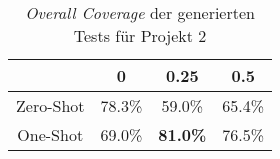 \bgroup
\def\arraystretch{2}
\begin{table}[H]
	\vspace{.5cm}
	\centering		
	\begin{center}
		\begin{tabular}{|c||c|c|c|}
			\hline 
			& 0 & 0.25 & 0.5 \\
			\hline 
			\hline
			Zero-Shot & 78.3\% & 59.0\% & 65.4\% \\
			\hline
			One-Shot & 69.0\% & \textbf{81.0\%} & 76.5\% \\
			\hline
		\end{tabular} 
	\end{center}
	\caption{\textit{Overall Coverage} der generierten Tests für Projekt 2}
	\label{fig:o-2}
	\vspace{-.8cm}
\end{table}
\egroup